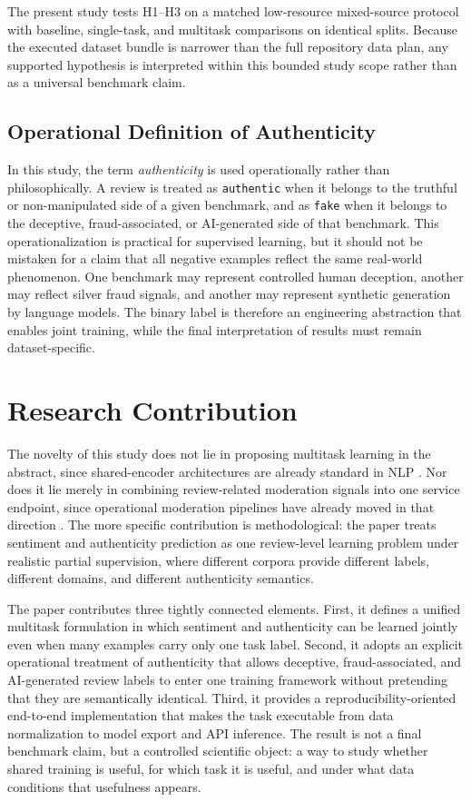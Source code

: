 \documentclass[12pt,a4paper]{article}
\begin{document}
The present study tests H1--H3 on a matched low-resource mixed-source protocol with baseline, single-task, and multitask comparisons on identical splits. Because the executed dataset bundle is narrower than the full repository data plan, any supported hypothesis is interpreted within this bounded study scope rather than as a universal benchmark claim.

\subsection{Operational Definition of Authenticity}

In this study, the term \textit{authenticity} is used operationally rather than philosophically. A review is treated as \texttt{authentic} when it belongs to the truthful or non-manipulated side of a given benchmark, and as \texttt{fake} when it belongs to the deceptive, fraud-associated, or AI-generated side of that benchmark. This operationalization is practical for supervised learning, but it should not be mistaken for a claim that all negative examples reflect the same real-world phenomenon. One benchmark may represent controlled human deception, another may reflect silver fraud signals, and another may represent synthetic generation by language models. The binary label is therefore an engineering abstraction that enables joint training, while the final interpretation of results must remain dataset-specific.

\section{Research Contribution}

The novelty of this study does not lie in proposing multitask learning in the abstract, since shared-encoder architectures are already standard in NLP \cite{liu2019}. Nor does it lie merely in combining review-related moderation signals into one service endpoint, since operational moderation pipelines have already moved in that direction \cite{nayak2022}. The more specific contribution is methodological: the paper treats sentiment and authenticity prediction as one review-level learning problem under realistic partial supervision, where different corpora provide different labels, different domains, and different authenticity semantics.

The paper contributes three tightly connected elements. First, it defines a unified multitask formulation in which sentiment and authenticity can be learned jointly even when many examples carry only one task label. Second, it adopts an explicit operational treatment of authenticity that allows deceptive, fraud-associated, and AI-generated review labels to enter one training framework without pretending that they are semantically identical. Third, it provides a reproducibility-oriented end-to-end implementation that makes the task executable from data normalization to model export and API inference. The result is not a final benchmark claim, but a controlled scientific object: a way to study whether shared training is useful, for which task it is useful, and under what data conditions that usefulness appears.
\end{document}
